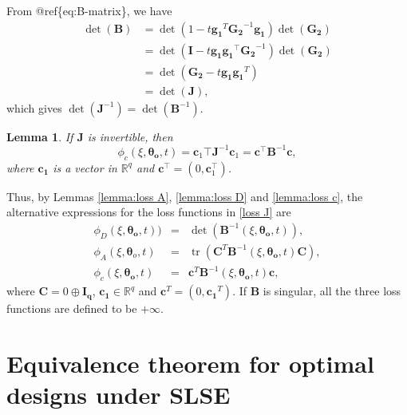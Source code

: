\documentclass[
]{book}
\newtheorem{lemma}{Lemma}[chapter]
\theoremstyle{definition}
\theoremstyle{definition}
\theoremstyle{definition}
\theoremstyle{definition}
\theoremstyle{remark}
\begin{document}
From @ref\{eq:B-matrix\}, we have
\begin{align*}
    \det(\boldsymbol{B})    &= \det(1-t\boldsymbol{g_1}^T\boldsymbol{G_2}^{-1}\boldsymbol{g_1})\det(\boldsymbol{G_2})\\
            &= \det(\boldsymbol{I}-t\boldsymbol{g_1}\boldsymbol{g_1}^\top\boldsymbol{G_2}^{-1}) \det(\boldsymbol{G_2}) \\
            &=  \det(\boldsymbol{G_2}-t\boldsymbol{g_1}\boldsymbol{g_1}^T)\\
            &= \det(\boldsymbol{J}),
    \end{align*}
which gives \(\det(\boldsymbol{J}^{-1})=\det(\boldsymbol{B}^{-1})\).

\begin{lemma}
\protect\hypertarget{lem:loss-c}{}\label{lem:loss-c}If \(\boldsymbol{J}\) is invertible, then
\begin{equation*}
    \phi_c(\xi,\boldsymbol{\theta_o},t)=\boldsymbol{c}_1\top\boldsymbol{J}^{-1}\boldsymbol{c}_1=\boldsymbol{c}^\top\boldsymbol{B}^{-1}\boldsymbol{c},
\end{equation*}
where \(\boldsymbol{c_1}\) is a vector in \(\mathbb{R}^q\) and \(\boldsymbol{c}^\top=(0,\boldsymbol{c}_1^\top)\).
\end{lemma}

Thus, by Lemmas \ref{lemma:loss A}, \ref{lemma:loss D} and \ref{lemma:loss c}, the alternative expressions for the loss functions in \eqref{loss J} are
\begin{equation} \label{loss B}
\begin{aligned}
    \phi_D(\xi,\boldsymbol{\theta_o},t))&=&\det(\boldsymbol{B}^{-1}(\xi,\boldsymbol{\theta_o},t)),\\
    \phi_A(\xi,\boldsymbol{\theta}_o,t)&=&\operatorname{tr}(\boldsymbol{C}^T\boldsymbol{B}^{-1}(\xi,\boldsymbol{\theta_o},t)\boldsymbol{C}),\\
    \phi_c(\xi,\boldsymbol{\theta_o},t)&=&\boldsymbol{c}^T\boldsymbol{B}^{-1}(\xi,\boldsymbol{\theta_o},t)\boldsymbol{c},
\end{aligned}
\end{equation}
where \(\boldsymbol{C}= 0 \oplus \boldsymbol{I_q}\), \(\boldsymbol{c_1}\in \mathbb{R}^q\) and \(\boldsymbol{c}^T=(0,\boldsymbol{c_1}^T)\). If \(\boldsymbol{B}\) is singular, all the three loss functions are defined to be \(+\infty\).

\hypertarget{equivalence-theorem-for-optimal-designs-under-slse}{%
\section{Equivalence theorem for optimal designs under SLSE}\label{equivalence-theorem-for-optimal-designs-under-slse}}
\end{document}
